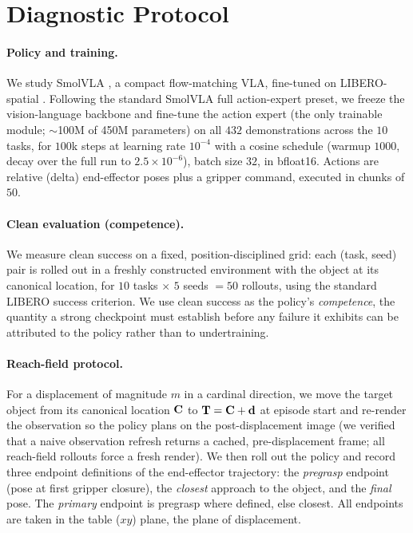 \section{Diagnostic Protocol}
\label{sec:protocol}

\paragraph{Policy and training.} We study SmolVLA \citep{shukor2025smolvla}, a compact flow-matching VLA, fine-tuned on LIBERO-spatial \citep{liu2023libero}. Following the standard SmolVLA full action-expert preset, we freeze the vision-language backbone and fine-tune the action expert (the only trainable module; $\sim$100M of 450M parameters) on all $432$ demonstrations across the $10$ tasks, for $100$k steps at learning rate $10^{-4}$ with a cosine schedule (warmup $1000$, decay over the full run to $2.5\times10^{-6}$), batch size $32$, in bfloat16. Actions are relative (delta) end-effector poses plus a gripper command, executed in chunks of $50$.

\paragraph{Clean evaluation (competence).} We measure clean success on a fixed, position-disciplined grid: each (task, seed) pair is rolled out in a freshly constructed environment with the object at its canonical location, for $10$ tasks $\times$ $5$ seeds $=50$ rollouts, using the standard LIBERO success criterion. We use clean success as the policy's \emph{competence}, the quantity a strong checkpoint must establish before any failure it exhibits can be attributed to the policy rather than to undertraining.

\paragraph{Reach-field protocol.} For a displacement of magnitude $m$ in a cardinal direction, we move the target object from its canonical location $\mathbf{C}$ to $\mathbf{T}=\mathbf{C}+\mathbf{d}$ at episode start and re-render the observation so the policy plans on the post-displacement image (we verified that a naive observation refresh returns a cached, pre-displacement frame; all reach-field rollouts force a fresh render). We then roll out the policy and record three endpoint definitions of the end-effector trajectory: the \emph{pregrasp} endpoint (pose at first gripper closure), the \emph{closest} approach to the object, and the \emph{final} pose. The \emph{primary} endpoint is pregrasp where defined, else closest. All endpoints are taken in the table ($xy$) plane, the plane of displacement.

